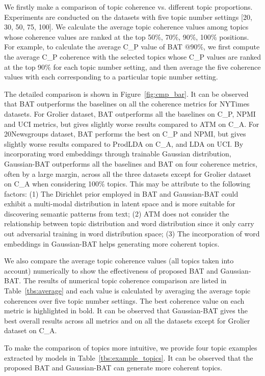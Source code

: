\documentclass[11pt,a4paper]{article}
\begin{document}
We firstly make a comparison of topic coherence vs. different topic proportions. Experiments are conducted on the datasets with five topic number settings [20, 30, 50, 75, 100]. We calculate the average topic coherence values among topics whose coherence values are ranked at the top 50$\%$, 70$\%$, 90$\%$, 100$\%$ positions. For example, to calculate the average C\_P value of BAT $@90\%$, {\color{black}we first compute the average C\_P coherence with the selected topics whose C\_P values are ranked at the top 90\% for each topic number setting, and then average the five coherence values with each corresponding to a particular topic number setting.}

{\color{black}The detailed comparison is shown in Figure~\ref{fig:cmp_bar}}. {\color{black}It can be observed that BAT outperforms the baselines on all the coherence metrics for NYTimes datasets. For Grolier dataset, BAT outperforms all the baselines on C\_P, NPMI and UCI metrics, but gives slightly worse results compared to ATM on C\_A. For 20Newsgroups dataset, BAT performs the best on C\_P and NPMI, but gives slightly worse results compared to ProdLDA on C\_A, and LDA on UCI. 
By incorporating word embeddings through trainable Gaussian distribution, Gaussian-BAT outperforms all the baselines and BAT on four coherence metrics, often by a large margin, across all the three datasets except for Grolier dataset on C\_A when considering 100\% topics. This may be attribute to the following factors: (1) The Dirichlet prior employed in BAT and Gaussian-BAT could exhibit a multi-modal distribution in latent space and is more suitable for discovering semantic patterns from text; (2) ATM does not consider the relationship between topic distribution and word distribution since it only carry out adversarial training in word distribution space;  (3) The incorporation of word embeddings in Gaussian-BAT helps generating more coherent topics.}

We also compare the average topic coherence values (all topics taken into account) numerically to show the effectiveness of proposed BAT and Gaussian-BAT. The results of numerical topic coherence comparison are listed in Table~\ref{tbs:average} and each value is calculated by averaging the average topic coherences over five topic number settings. 
The best coherence value on each metric is highlighted in bold. It can be observed that Gaussian-BAT gives the best overall results across all metrics and on all the datasets except for Grolier dataset on C\_A. {\color{black} To make the comparison of topics more intuitive, we provide four topic examples extracted by models in Table~\ref{tbs:example_topics}. {\color{black}It can be observed that the proposed BAT and Gaussian-BAT can generate more coherent topics.} 


}
\end{document}
